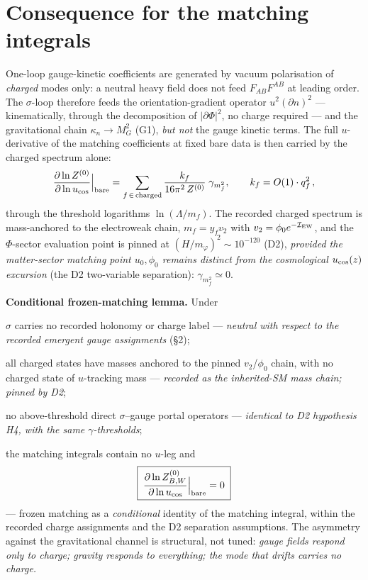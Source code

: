\documentclass[11pt,a4paper]{article}
\begin{document}
\section{Consequence for the matching integrals}
One-loop gauge-kinetic coefficients are generated by vacuum polarisation of
\emph{charged} modes only: a neutral heavy field does not feed $F_{AB}F^{AB}$
at leading order. The $\sigma$-loop therefore feeds the orientation-gradient
operator $u^2(\partial n)^2$ --- kinematically, through the decomposition of
$|\partial\Phi|^2$, no charge required --- and the gravitational chain
$\kappa_n\to M_G^2$ (G1), \emph{but not} the gauge kinetic terms. The full
$u$-derivative of the matching coefficients at fixed bare data is then carried
by the charged spectrum alone:
\[
\frac{\partial\ln Z^{(0)}}{\partial\ln u_{\rm cos}}\Big|_{\rm bare}
=\sum_{f\,\in\,\text{charged}}\frac{k_f}{16\pi^2\,Z^{(0)}}\;
\gamma_{m_f^2},
\qquad k_f=O(1)\cdot q_f^2\,,
\]
through the threshold logarithms $\ln(\Lambda/m_f)$. The recorded charged
spectrum is mass-anchored to the electroweak chain, $m_f=y_f v_2$ with
$v_2=\phi_0e^{-\mathcal I_{\rm EW}}$, and the $\Phi$-sector evaluation point is
pinned at $(H/m_\varphi)^2\sim10^{-120}$ (D2), \emph{provided the
matter-sector matching point $u_0,\phi_0$ remains distinct from the
cosmological $u_{\rm cos}(z)$ excursion} (the D2 two-variable separation):
$\gamma_{m_f^2}\simeq0$.

\textbf{Conditional frozen-matching lemma.} Under
\begin{description}[leftmargin=2.0em,itemsep=2pt]
\item[(C-a)] $\sigma$ carries no recorded holonomy or charge label ---
\emph{neutral with respect to the recorded emergent gauge assignments} (\S2);
\item[(C-b)] all charged states have masses anchored to the pinned
$v_2$/$\phi_0$ chain, with no charged state of $u$-tracking mass ---
\emph{recorded as the inherited-SM mass chain; pinned by D2};
\item[(C-c)] no above-threshold direct $\sigma$--gauge portal operators ---
\emph{identical to D2 hypothesis H4, with the same $\gamma$-thresholds};
\end{description}
the matching integrals contain no $u$-leg and
\[
\boxed{\;\frac{\partial\ln Z_{B,W}^{(0)}}{\partial\ln u_{\rm cos}}
\Big|_{\rm bare}=0\;}
\]
--- frozen matching as a \emph{conditional} identity of the matching
integral, within the recorded charge assignments and the D2 separation
assumptions. The asymmetry against the
gravitational channel is structural, not tuned: \emph{gauge fields respond
only to charge; gravity responds to everything; the mode that drifts carries
no charge.}
\end{document}
